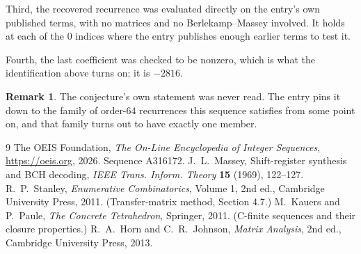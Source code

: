 \documentclass[11pt,a4paper]{article}
\theoremstyle{plain}
\theoremstyle{definition}
\newtheorem{remark}[theorem]{Remark}
\begin{document}
Third, the recovered recurrence was evaluated directly on the entry's own published terms, with
no matrices and no Berlekamp--Massey involved. It holds at each of the $0$ indices where
the entry publishes enough earlier terms to test it.

Fourth, the last coefficient was checked to be nonzero, which is what the identification above
turns on; it is $-2816$.

\begin{remark}
The conjecture's own statement was never read. The entry pins it down to the family of
order-$64$ recurrences this sequence satisfies from some point on, and that family turns
out to have exactly one member.
\end{remark}

\begin{thebibliography}{9}
 The OEIS Foundation, \emph{The On-Line Encyclopedia of Integer
Sequences}, \url{https://oeis.org}, 2026. Sequence A316172.
 J.~L.~Massey, Shift-register synthesis and BCH decoding, \emph{IEEE
Trans. Inform. Theory} \textbf{15} (1969), 122--127.
 R.~P.~Stanley, \emph{Enumerative Combinatorics}, Volume 1, 2nd ed.,
Cambridge University Press, 2011. (Transfer-matrix method, Section 4.7.)
 M.~Kauers and P.~Paule, \emph{The Concrete Tetrahedron}, Springer, 2011.
(C-finite sequences and their closure properties.)
 R.~A.~Horn and C.~R.~Johnson, \emph{Matrix Analysis}, 2nd ed., Cambridge
University Press, 2013.
\end{thebibliography}
\end{document}
